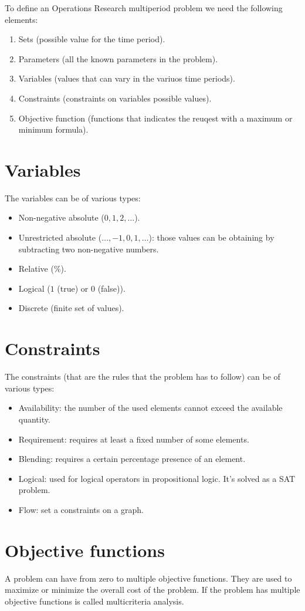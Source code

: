 \documentclass[12pt, a4paper]{report}
\newtheorem[style=M,bodystyle=\normalfont]{theorem}{Theorem}
\newtheorem[style=M,bodystyle=\normalfont]{corollary}{Corollary}
\newtheorem[style=M,bodystyle=\normalfont]{lemma}{Lemma}
\newtheorem[style=M,bodystyle=\normalfont]{definition}{Definition}
\begin{document}
To define an Operations Research multiperiod problem we need the following elements:
\begin{enumerate}
    \item Sets (possible value for the time period).
    \item Parameters (all the known parameters in the problem).
    \item Variables (values that can vary in the variuos time periods).
    \item Constraints (constraints on variables possible values).
    \item Objective function (functions that indicates the reuqest with a maximum or minimum formula).
\end{enumerate}
\section{Variables}
The variables can be of various types: 
\begin{itemize}
    \item Non-negative absolute ($0,1,2,\dots$).
    \item Unrestricted absolute ($\dots,-1,0,1,\dots$): those values can be obtaining by subtracting two non-negative numbers.
    \item Relative ($\%$).
    \item Logical ($1$ (true) or $0$ (false)).
    \item Discrete (finite set of values).
\end{itemize}
\section{Constraints}
The constraints (that are the rules that the problem has to follow) can be of various types: 
\begin{itemize}
    \item Availability: the number of the used elements cannot exceed the available quantity.
    \item Requirement: requires at least a fixed number of some elements.
    \item Blending: requires a certain percentage presence of an element.
    \item Logical: used for logical operators in propositional logic. It's solved as a SAT problem.
    \item Flow: set a constraints on a graph.
\end{itemize}
\section{Objective functions}
A problem can have from zero to multiple objective functions. They are used to maximize or minimize the overall cost of the problem.
If the problem has multiple objective functions is called multicriteria analysis. 
\end{document}
